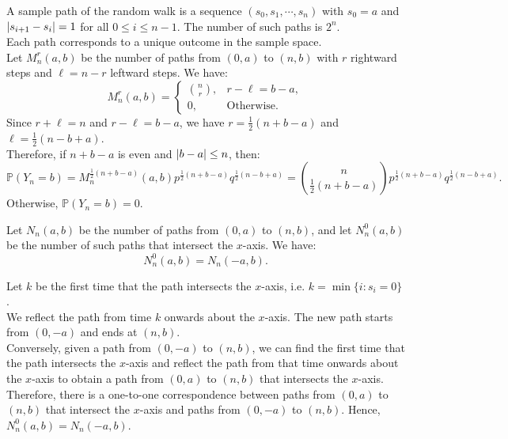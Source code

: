 \documentclass{huhtakm-template-book-v2}
\newcommand{\prob}{\mathbb{P}}
\begin{document}
    \begin{eg}
        \label{Appendix A (Example) Sample Path Counting}
        A sample path of the random walk is a sequence $(s_{0},s_{1},\cdots,s_{n})$ with $s_{0} = a$ and $\left|{s_{i+1}-s_{i}}\right| = 1$ for all $0 \leq i \leq n-1$. The number of such paths is $2^{n}$.\\
        Each path corresponds to a unique outcome in the sample space.\\
        Let $M_{n}^{r}(a, b)$ be the number of paths from $(0,a)$ to $(n,b)$ with $r$ rightward steps and $\ell = n-r$ leftward steps. We have:
        \begin{equation*}
            M_{n}^{r}(a, b) = \begin{cases}
                \binom{n}{r}, & r-\ell = b-a,\\
                0, & \text{Otherwise}.
            \end{cases}
        \end{equation*}
        Since $r+\ell = n$ and $r-\ell = b-a$, we have $r = \frac{1}{2}(n+b-a)$ and $\ell = \frac{1}{2}(n-b+a)$.\\
        Therefore, if $n+b-a$ is even and $\left|{b-a}\right| \leq n$, then:
        \begin{equation*}
            \prob(Y_{n} = b) = M_{n}^{\frac{1}{2}(n+b-a)}(a, b)p^{\frac{1}{2}(n+b-a)}q^{\frac{1}{2}(n-b+a)} = \binom{n}{\frac{1}{2}(n+b-a)}p^{\frac{1}{2}(n+b-a)}q^{\frac{1}{2}(n-b+a)}.
        \end{equation*}
        Otherwise, $\prob(Y_{n} = b) = 0$.
    \end{eg}
    \begin{thm}
        Let $N_{n}(a, b)$ be the number of paths from $(0,a)$ to $(n,b)$, and let $N_{n}^{0}(a, b)$ be the number of such paths that intersect the $x$-axis. We have:
        \begin{equation*}
            N_{n}^{0}(a, b) = N_{n}(-a,b).
        \end{equation*}
    \end{thm}
    \begin{proofing}
        Let $k$ be the first time that the path intersects the $x$-axis, i.e. $k = \min\{i:s_{i} = 0\}$.\\
        We reflect the path from time $k$ onwards about the $x$-axis. The new path starts from $(0,-a)$ and ends at $(n,b)$.\\
        Conversely, given a path from $(0,-a)$ to $(n,b)$, we can find the first time that the path intersects the $x$-axis and reflect the path from that time onwards about the $x$-axis to obtain a path from $(0,a)$ to $(n,b)$ that intersects the $x$-axis. Therefore, there is a one-to-one correspondence between paths from $(0,a)$ to $(n,b)$ that intersect the $x$-axis and paths from $(0,-a)$ to $(n,b)$. Hence, $N_{n}^{0}(a, b) = N_{n}(-a,b)$.
    \end{proofing}
\end{document}
